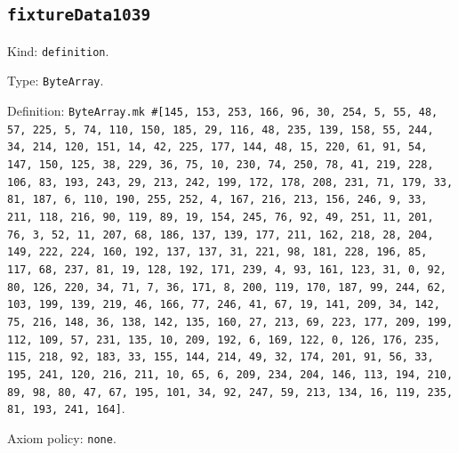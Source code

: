 \documentclass[11pt]{article}
\begin{document}
\subsection*{\texttt{fixtureData1039}}
\noindent Kind: \texttt{definition}.\par
\noindent Type: \texttt{ByteArray}.\par
\noindent Definition: \texttt{ByteArray.mk \#[145, 153, 253, 166, 96, 30, 254, 5, 55, 48, 57, 225, 5, 74, 110, 150, 185, 29, 116, 48, 235, 139, 158, 55, 244, 34, 214, 120, 151, 14, 42, 225, 177, 144, 48, 15, 220, 61, 91, 54, 147, 150, 125, 38, 229, 36, 75, 10, 230, 74, 250, 78, 41, 219, 228, 106, 83, 193, 243, 29, 213, 242, 199, 172, 178, 208, 231, 71, 179, 33, 81, 187, 6, 110, 190, 255, 252, 4, 167, 216, 213, 156, 246, 9, 33, 211, 118, 216, 90, 119, 89, 19, 154, 245, 76, 92, 49, 251, 11, 201, 76, 3, 52, 11, 207, 68, 186, 137, 139, 177, 211, 162, 218, 28, 204, 149, 222, 224, 160, 192, 137, 137, 31, 221, 98, 181, 228, 196, 85, 117, 68, 237, 81, 19, 128, 192, 171, 239, 4, 93, 161, 123, 31, 0, 92, 80, 126, 220, 34, 71, 7, 36, 171, 8, 200, 119, 170, 187, 99, 244, 62, 103, 199, 139, 219, 46, 166, 77, 246, 41, 67, 19, 141, 209, 34, 142, 75, 216, 148, 36, 138, 142, 135, 160, 27, 213, 69, 223, 177, 209, 199, 112, 109, 57, 231, 135, 10, 209, 192, 6, 169, 122, 0, 126, 176, 235, 115, 218, 92, 183, 33, 155, 144, 214, 49, 32, 174, 201, 91, 56, 33, 195, 241, 120, 216, 211, 10, 65, 6, 209, 234, 204, 146, 113, 194, 210, 89, 98, 80, 47, 67, 195, 101, 34, 92, 247, 59, 213, 134, 16, 119, 235, 81, 193, 241, 164]}.\par
\noindent Axiom policy: \texttt{none}.\par
\end{document}
